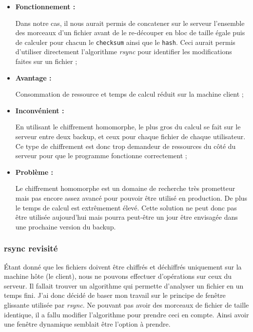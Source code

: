 \documentclass[a4paper,10pt, twoside]{report}
\begin{document}
\begin{spacing}{1.2}
\begin{itemize}
 \item \textbf{Fonctionnement :}
 
 Dans notre cas, il nous aurait permis de concatener sur le serveur l'ensemble
 des morceaux d'un fichier avant de le re-découper en bloc de taille égale
 puis de calculer pour chacun le \texttt{checksum} ainsi que le
 \texttt{hash}. Ceci aurait permis d'utiliser directement l'algorithme
 \textit{rsync} pour identifier les modifications faites sur un fichier ;

 \item \textbf{Avantage :}
 
 Consommation de ressource et temps de calcul réduit sur la machine client ;
 
 \item \textbf{Inconvénient :}
 
 En utilisant le chiffrement homomorphe, le plus gros du calcul se fait sur le
 serveur entre deux backup, et ceux pour chaque fichier de chaque utilisateur.
 Ce type de chiffrement est donc trop demandeur de ressources du côté du
 serveur pour que le programme fonctionne correctement ;

 \item \textbf{Problème :}
 
 Le chiffrement homomorphe est un domaine de recherche très prometteur mais
 pas encore assez avancé pour pouvoir être utilisé en production. De plus le
 temps de calcul est extrêmement élevé. Cette solution ne peut donc pas être
 utilisée aujourd'hui mais pourra peut-être un jour être envisagée dans une
 prochaine version du backup.
\end{itemize}

\subsubsection{rsync revisité}

Étant donné que les fichiers doivent être chiffrés et déchiffrés uniquement sur
la machine hôte (le client), nous ne pouvons effectuer d'opérations sur ceux du
serveur. Il fallait trouver un algorithme qui permette d'analyser un fichier en
un temps fini. J'ai donc décidé de baser mon travail sur le principe de fenêtre
glissante utilisée par \textit{rsync}. Ne pouvant pas avoir des morceaux de
fichier de taille identique, il a fallu modifier l'algorithme pour prendre ceci
en compte. Ainsi avoir une fenêtre dynamique semblait être l'option à prendre.


\end{spacing}
\end{document}
